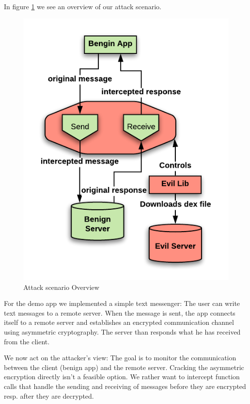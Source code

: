 In figure \ref{ModelOverview} we see an overview of our attack scenario.
\begin{figure}[H]
	\begin{center}
		\includegraphics[scale=0.45]{figures/AttackOverview.png}
	\end{center}
	\caption{Attack scenario Overview}
	\label{ModelOverview}
\end{figure}


For the demo app we implemented a simple text messenger: The user can write text messages to a remote server. When the message is sent, the app connects itself to a remote server and establishes an encrypted communication channel using asymmetric cryptography. The server than responds what he has received from the client.

We now act on the attacker's view: The goal is to monitor the communication between the client (benign app) and the remote server. 
Cracking the asymmetric encryption directly isn't a feasible option. We rather want to intercept function calls that handle the sending and receiving of messages before they are encrypted resp. after they are decrypted.


